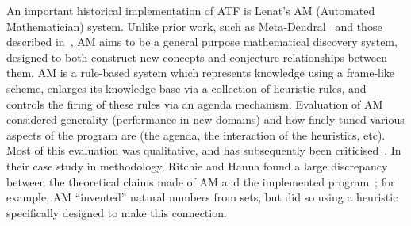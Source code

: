 An important historical implementation of ATF is Lenat's AM (Automated
Mathematician) system. Unlike prior work, such as
Meta-Dendral~\cite{buchanan:75} and those described in~\cite{winston}, AM aims
to be a general purpose mathematical discovery system, designed to both
construct new concepts and conjecture relationships between them. AM is a
rule-based system which represents knowledge using a frame-like scheme, enlarges
its knowledge base via a collection of heuristic rules, and controls the firing
of these rules via an agenda mechanism. Evaluation of AM considered generality
(performance in new domains) and how finely-tuned various aspects of the program
are (the agenda, the interaction of the heuristics, etc). Most of this
evaluation was qualitative, and has subsequently been
criticised~\cite[chap.~13]{colton:book}. In their case study in methodology,
Ritchie and Hanna found a large discrepancy between the theoretical claims made
of AM and the implemented program~\cite{ritchie1984case}; for example, AM ``invented''
natural numbers from sets, but did so using a heuristic specifically designed to
make this connection.
